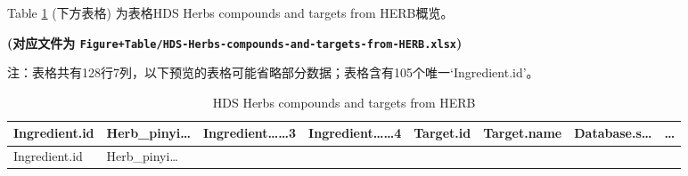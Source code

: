 \documentclass[
]{article}
\begin{document}
Table \ref{tab:HDS-Herbs-compounds-and-targets-from-HERB} (下方表格) 为表格HDS Herbs compounds and targets from HERB概览。

\textbf{(对应文件为 \texttt{Figure+Table/HDS-Herbs-compounds-and-targets-from-HERB.xlsx})}

\begin{center}\begin{tcolorbox}[colback=gray!10, colframe=gray!50, width=0.9\linewidth, arc=1mm, boxrule=0.5pt]注：表格共有128行7列，以下预览的表格可能省略部分数据；表格含有105个唯一`Ingredient.id'。
\end{tcolorbox}
\end{center}

\begin{longtable}[]{@{}llllllll@{}}
\caption{\label{tab:HDS-Herbs-compounds-and-targets-from-HERB}HDS Herbs compounds and targets from HERB}\tabularnewline
\toprule
\begin{minipage}[b]{0.11\columnwidth}\raggedright
Ingredient.id\strut
\end{minipage} & \begin{minipage}[b]{0.11\columnwidth}\raggedright
Herb\_pinyi\ldots{}\strut
\end{minipage} & \begin{minipage}[b]{0.14\columnwidth}\raggedright
Ingredient\ldots\ldots3\strut
\end{minipage} & \begin{minipage}[b]{0.14\columnwidth}\raggedright
Ingredient\ldots\ldots4\strut
\end{minipage} & \begin{minipage}[b]{0.08\columnwidth}\raggedright
Target.id\strut
\end{minipage} & \begin{minipage}[b]{0.09\columnwidth}\raggedright
Target.name\strut
\end{minipage} & \begin{minipage}[b]{0.11\columnwidth}\raggedright
Database.s\ldots{}\strut
\end{minipage} & \begin{minipage}[b]{0.03\columnwidth}\raggedright
\ldots{}\strut
\end{minipage}\tabularnewline
\midrule
\endfirsthead
\toprule
\begin{minipage}[b]{0.11\columnwidth}\raggedright
Ingredient.id\strut
\end{minipage} & \begin{minipage}[b]{0.11\columnwidth}\raggedright
Herb\_pinyi\ldots{}\strut

\end{minipage}
\end{longtable}
\end{document}
